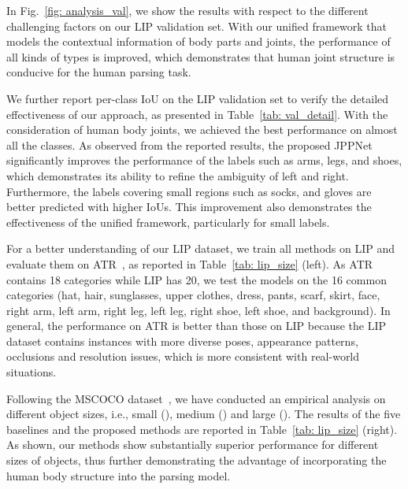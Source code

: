 \documentclass[10pt,journal,compsoc]{IEEEtran}
\begin{document}
In Fig.~\ref{fig: analysis_val}, we show the results with respect to the different challenging factors on our LIP validation set. With our unified framework that models the contextual information of body parts and joints, the performance of all kinds of types is improved, which demonstrates that human joint structure is conducive for the human parsing task.

We further report per-class IoU on the LIP validation set to verify the detailed effectiveness of our approach, as presented in Table~\ref{tab: val_detail}. With the consideration of human body joints, we achieved the best performance on almost all the classes. As observed from the reported results, the proposed JPPNet significantly improves the performance of the labels such as arms, legs, and shoes, which demonstrates its ability to refine the ambiguity of left and right. Furthermore, the labels covering small regions such as socks, and gloves are better predicted with higher IoUs. This improvement also demonstrates the effectiveness of the unified framework, particularly for small labels.

For a better understanding of our LIP dataset, {we train all methods on LIP and evaluate them on ATR~\cite{Co-CNN}, as reported in Table~\ref{tab: lip_size} (left). As ATR contains 18 categories while LIP has 20, we test the models on the 16 common categories (hat, hair, sunglasses, upper clothes, dress, pants, scarf, skirt, face, right arm, left arm, right leg, left leg, right shoe, left shoe, and background). } In general, the performance on ATR is better than those on LIP because the LIP dataset contains instances with more diverse poses, appearance patterns, occlusions and resolution issues, which is more consistent with real-world situations. 

Following the MSCOCO dataset~\cite{DBLP:journals/corr/LinMBHPRDZ14}, we have conducted an empirical analysis on different object sizes, i.e., small (), medium () and large (). The results of the five baselines and the proposed methods are reported in Table~\ref{tab: lip_size} (right). As shown, our methods show substantially superior performance for different sizes of objects, thus further demonstrating the advantage of incorporating the human body structure into the parsing model.
\end{document}
